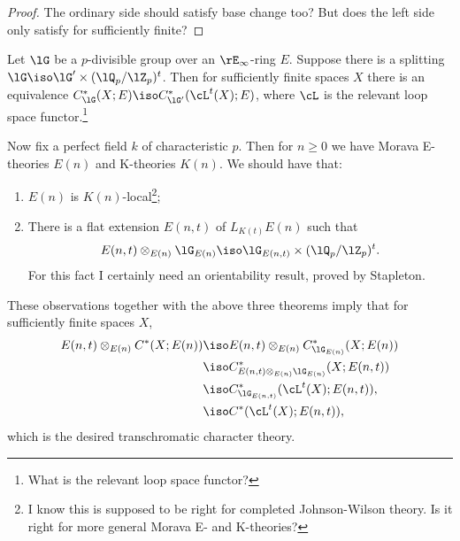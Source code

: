 \begin{proof}
  The ordinary side should satisfy base change too? But does the left
  side only satisfy for sufficiently finite?
\end{proof}

\begin{theorem}
  \label{splitting}
  Let $\lG$ be a $p$-divisible group over an $\rE_\infty$-ring
  $E$. Suppose there is a splitting
  $\lG \iso \lG' \times (\lQ_p/\lZ_p)^t$. Then for sufficiently finite
  spaces $X$ there is an equivalence
  $C_\lG^*(X;E) \iso C_{\lG'}^*(\cL^t(X);E)$, where $\cL$ is the relevant
  loop space functor.\footnote{What is the relevant loop space
    functor?}
\end{theorem}

Now fix a perfect field $k$ of characteristic $p$. Then for $n \ge 0$
we have Morava E-theories $E(n)$ and K-theories $K(n)$. We should have
that:
\begin{enumerate}
\item $E(n)$ is $K(n)$-local\footnote{I know this is supposed to be
    right for completed Johnson-Wilson theory. Is it right for more
    general Morava E- and K-theories?};
\item There is a flat extension $E(n,t)$ of $L_{K(t)}E(n)$ such that
  \[
  E(n,t) \otimes_{E(n)}\lG_{E(n)} \iso \lG_{E(n,t)} \times (\lQ_p/\lZ_p)^t.
  \]
  For this fact I certainly need an orientability result, proved by
  Stapleton.
\end{enumerate}
These observations together with the above three theorems imply that
for sufficiently finite spaces $X$,
\begin{align*}
  E(n,t) \otimes_{E(n)} C^*(X;E(n))
  & \iso E(n,t) \otimes_{E(n)} C_{\lG_{E(n)}}^*(X;E(n)) \\
  & \iso C_{E(n,t) \otimes_{E(n)} \lG_{E(n)}}^*(X;E(n,t)) \\
  & \iso C_{\lG_{E(n,t)}}^*(\cL^t(X);E(n,t)), \\
  & \iso C^*(\cL^t(X);E(n,t)),
\end{align*}
which is the desired transchromatic character theory.
